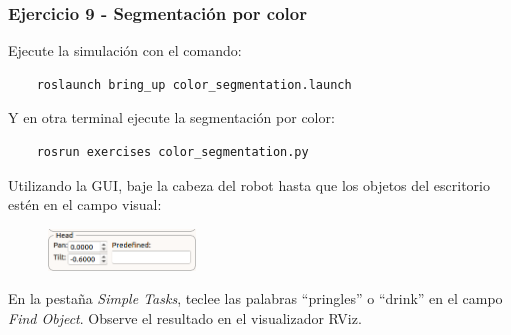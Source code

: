 \begin{frame}[containsverbatim]\frametitle{Ejercicio 9 - Segmentación por color}
  Ejecute la simulación con el comando:
  \begin{lstlisting}
    roslaunch bring_up color_segmentation.launch
  \end{lstlisting}
  Y en otra terminal ejecute la segmentación por color:
  \begin{lstlisting}
    rosrun exercises color_segmentation.py
  \end{lstlisting}
  Utilizando la GUI, baje la cabeza del robot hasta que los objetos del escritorio estén en el campo visual:
  \begin{figure}
    \centering
    \includegraphics[width=0.35\textwidth]{Figures/Exercise5Gui1.png}
  \end{figure}
  En la pestaña \textit{Simple Tasks}, teclee las palabras ``pringles'' o ``drink'' en el campo \textit{Find Object}. Observe el resultado en el visualizador RViz. 
\end{frame}
